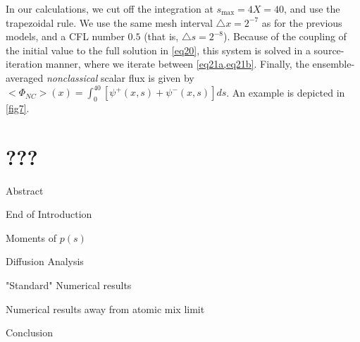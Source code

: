 \documentclass[12pt]{article}
\newcommand{\bl}{\big<}
\newcommand{\bg}{\big>}
\begin{document}
In our calculations, we cut off the integration at $s_{\text{max}}=4X=40$, and use the trapezoidal rule.
We use the same mesh interval $\triangle x=2^{-7}$ as for the previous models, and a CFL number $0.5$ (that is, $\triangle s = 2^{-8}$). 
Because of the coupling of the initial value to the full solution in \cref{eq20}, this system is solved in a source-iteration manner, where we iterate between \cref{eq21a,eq21b}.
Finally, the ensemble-averaged {\em nonclassical} scalar flux is given by $\bl\Phi_{NC}\bg(x) = \int_0^{40}[\psi^+(x,s)+\psi^-(x,s)]ds$. An example is depicted in \cref{fig7}.


\section{???}


Abstract

End of Introduction

Moments of $p(s)$

Diffusion Analysis

"Standard" Numerical results

Numerical results away from atomic mix limit

Conclusion

\pagebreak
\begin{singlespace}


\end{singlespace}
\end{document}
